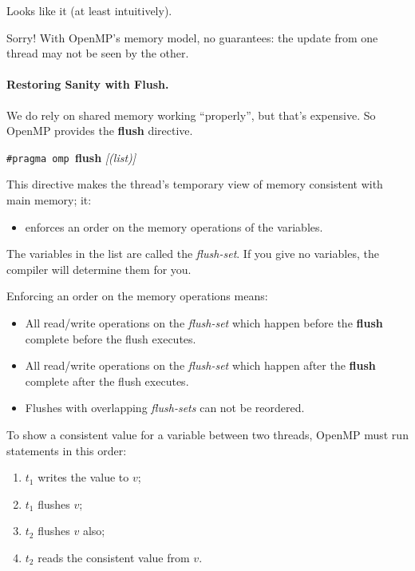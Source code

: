 Looks like it (at least intuitively).

Sorry! With OpenMP's memory model, no guarantees:
the update from one thread may not be seen by the other.

\paragraph{Restoring Sanity with Flush.} We do rely on 
shared memory working ``properly'', but that's expensive.
So OpenMP provides the {\bf flush} directive.

  \begin{center}
    {\tt \#pragma omp }{\bf flush} {\it[(list)]}
  \end{center}

This directive makes the thread's temporary view of memory consistent with main
      memory; it:
\begin{itemize}
    \item enforces an order on the memory operations of the variables.
\end{itemize}

The variables in the list are called the {\it flush-set}. 
If you give no variables, the compiler will determine them for you.

Enforcing an order on the memory operations means:
\begin{itemize}
    \item All read/write operations on the {\it flush-set} which happen
      before the {\bf flush} complete before the flush executes.
    \item All read/write operations on the {\it flush-set} which happen
      after the {\bf flush} complete after the flush executes.
    \item Flushes with overlapping {\it flush-sets} can not be reordered.
\end{itemize}

To show a consistent value for a variable between two threads, OpenMP
must run statements in this order:

  \begin{enumerate}
    \item $t_1$ writes the value to $v$;
    \item $t_1$ flushes $v$; 
    \item $t_2$ flushes $v$ also;
    \item $t_2$ reads the consistent value from $v$.
  \end{enumerate}

